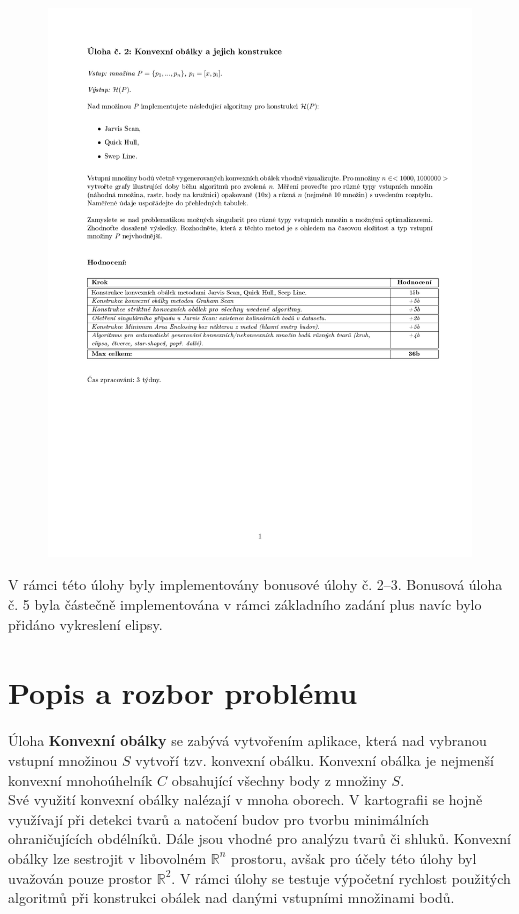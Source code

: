 \documentclass[a4paper, 12pt]{article}
\begin{document}
\begin{figure}[h!]
	\includegraphics[clip, trim=0cm 10cm 0cm 3cm, width=1.0\textwidth]{./pictures/zadani02.pdf}
\end{figure}

V rámci této úlohy byly implementovány bonusové úlohy č. 2–3. Bonusová úloha č. 5 byla částečně implementována v rámci základního zadání plus navíc bylo přidáno vykreslení elipsy.
\clearpage

\section{Popis a rozbor problému}
Úloha \textbf{Konvexní obálky} se zabývá vytvořením aplikace, která nad vybranou vstupní množinou $S$ vytvoří tzv. konvexní obálku. Konvexní obálka je nejmenší konvexní mnoho\-úhelník $C$ obsahující všechny body z množiny $S$.\\ 

Své využití konvexní obálky nalézají v mnoha oborech. V kartografii se hojně využívají při detekci tvarů a natočení budov pro tvorbu minimálních ohraničujících obdélníků. Dále jsou vhodné pro analýzu tvarů či shluků. Konvexní obálky lze sestrojit v libovolném $\mathbb{R}^n$ prostoru, avšak pro účely této úlohy byl uvažován pouze prostor $\mathbb{R}^2$. V rámci úlohy se testuje výpočetní rychlost použitých algoritmů při konstrukci obálek nad danými vstupními množinami bodů.
\end{document}
